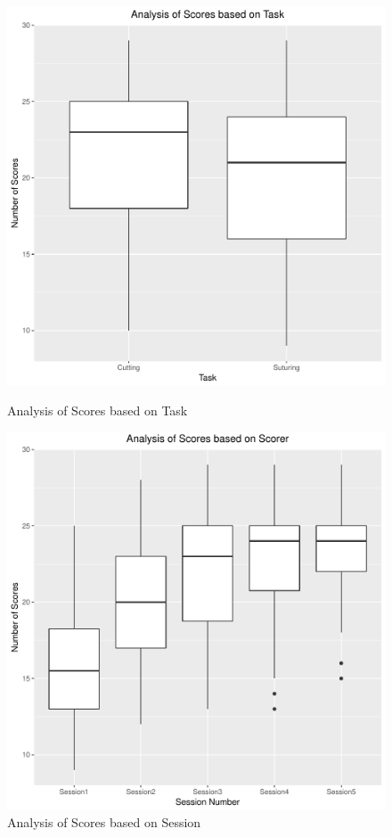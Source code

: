 \documentclass[12pt,epsf]{report}
\begin{document}
\begin{figure}[!htb]
	\begin{minipage}[c]{0.5\linewidth}
	\includegraphics[width=\linewidth]{TaskVsScore.pdf}
	\caption{Analysis of Scores based on Task}
	\end{minipage}
	\hfill
	\begin{minipage}[c]{0.5\linewidth}
	\includegraphics[width=\linewidth]{SessionVsScore.pdf}
	\caption{Analysis of Scores based on Session}
	\end{minipage}
\end{figure}
\end{document}
